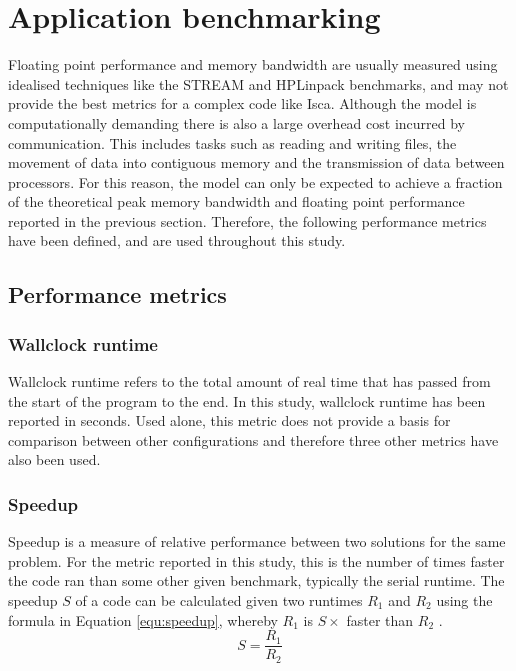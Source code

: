 \documentclass[a4paper,11pt]{report}
\begin{document}
\section{Application benchmarking}
\label{sec:app-benchmarking}
Floating point performance and memory bandwidth are usually measured using idealised techniques like the STREAM and HPLinpack benchmarks, and may not provide the best metrics for a complex code like Isca. Although the model is computationally demanding there is also a large overhead cost incurred by communication. This includes tasks such as reading and writing files, the movement of data into contiguous memory and the transmission of data between processors. For this reason, the model can only be expected to achieve a fraction of the theoretical peak memory bandwidth and floating point performance reported in the previous section. Therefore, the following performance metrics have been defined, and are used throughout this study.
\subsection{Performance metrics}

\subsubsection{Wallclock runtime} 
Wallclock runtime refers to the total amount of real time that has passed from the start of the program to the end. In this study, wallclock runtime has been reported in seconds. Used alone, this metric does not provide a basis for comparison between other configurations and therefore three other metrics have also been used.
	
\subsubsection{Speedup} 
Speedup is a measure of relative performance between two solutions for the same problem. For the metric reported in this study, this is the number of times faster the code ran than some other given benchmark, typically the serial runtime. The speedup $S$ of a code can be calculated given two runtimes $R_1$ and $R_2$ using the formula in Equation \ref{equ:speedup}, whereby $R_1$ is $S\times$ faster than $R_2$ \cite{kumar1994analyzing}.
\begin{equation}
S = \frac{R_1}{R_2} 
\label{equ:speedup}
\end{equation}
	
\end{document}
